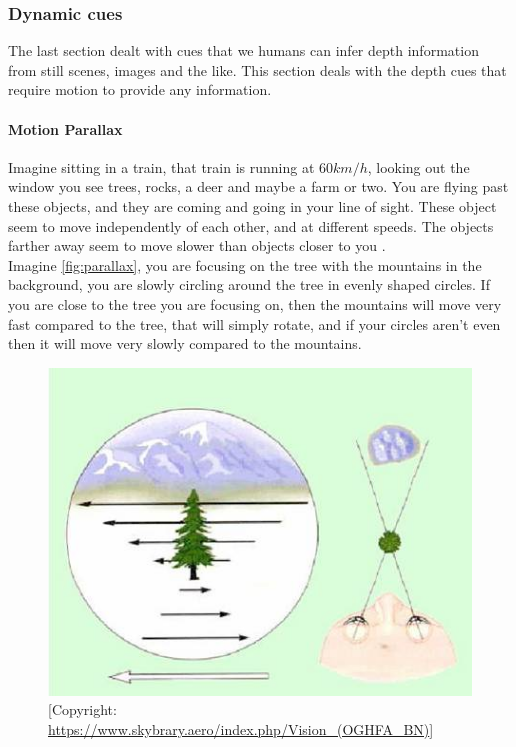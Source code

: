 		\subsubsection{Dynamic cues}
			The last section dealt with cues that we humans can infer depth information from still scenes, images and the like. This section deals with the depth cues that require motion to provide any information.
			\paragraph{Motion Parallax}
				Imagine sitting in a train, that train is running at 60$km/h$, looking out the window you see trees, rocks, a deer and maybe a farm or two. You are flying past these objects, and they are coming and going in your line of sight. These object seem to move independently of each other, and at different speeds. The objects farther away seem to move slower than objects closer to you \citep{sensationPerception}.\\
				
				Imagine \autoref{fig:parallax}, you are focusing on the tree with the mountains in the background, you are slowly circling around the tree in evenly shaped circles. If you are close to the tree you are focusing on, then the mountains will move very fast compared to the tree, that will simply rotate, and if your circles aren't even then it will move very slowly compared to the mountains.
				\begin{figure}[H]
					\centering
					\includegraphics[width=0.7\linewidth]{figure/parallax}
					\caption{ [Copyright: \url{https://www.skybrary.aero/index.php/Vision_(OGHFA_BN)}]}
					\label{fig:parallax}
				\end{figure}
